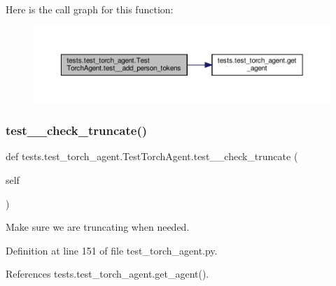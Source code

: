 Here is the call graph for this function\+:
\nopagebreak
\begin{figure}[H]
\begin{center}
\leavevmode
\includegraphics[width=350pt]{classtests_1_1test__torch__agent_1_1TestTorchAgent_a81c474c311d1825377b107d40d567d8a_cgraph}
\end{center}
\end{figure}
\mbox{\label{classtests_1_1test__torch__agent_1_1TestTorchAgent_ab5ef383cb36b970850bb3e171c832f36}} 
\subsubsection{\texorpdfstring{test\+\_\+\+\_\+check\+\_\+truncate()}{test\_\_check\_truncate()}}
{\footnotesize\ttfamily def tests.\+test\+\_\+torch\+\_\+agent.\+Test\+Torch\+Agent.\+test\+\_\+\+\_\+check\+\_\+truncate (\begin{DoxyParamCaption}\item[{}]{self }\end{DoxyParamCaption})}

\begin{DoxyVerb}Make sure we are truncating when needed.\end{DoxyVerb}
 

Definition at line 151 of file test\+\_\+torch\+\_\+agent.\+py.



References tests.\+test\+\_\+torch\+\_\+agent.\+get\+\_\+agent().

